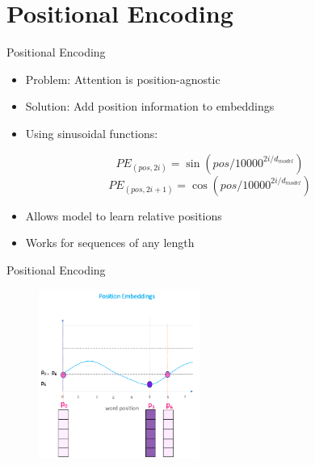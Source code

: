 \documentclass[serif, aspectratio=169]{beamer}
\begin{document}
\section{Positional Encoding}
\begin{frame}{Positional Encoding}
    \begin{itemize}
        \item Problem: Attention is position-agnostic
        \item Solution: Add position information to embeddings
        \item Using sinusoidal functions:
    \end{itemize}
    \begin{equation*}
        PE_{(pos,2i)} = \sin(pos/10000^{2i/d_{model}})
    \end{equation*}
    \begin{equation*}
        PE_{(pos,2i+1)} = \cos(pos/10000^{2i/d_{model}})
    \end{equation*}

    \begin{itemize}
        \item Allows model to learn relative positions
        \item Works for sequences of any length
    \end{itemize}
    
\end{frame}


\begin{frame}{Positional Encoding}

    \begin{figure}
        \centering
        \includegraphics[width=0.47\textwidth]{pic/positional-encoding-1.png}
        \label{fig:positional-encoding-1}
    \end{figure}
\end{frame}
\end{document}
